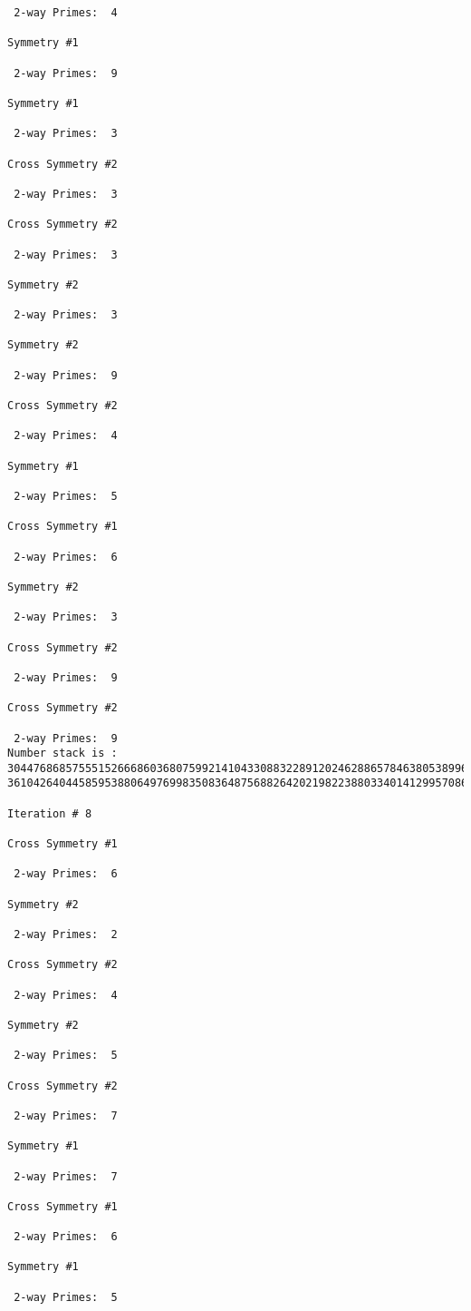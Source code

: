 \begin{verbatim}
 2-way Primes: 	4

Symmetry #1

 2-way Primes: 	9

Symmetry #1

 2-way Primes: 	3

Cross Symmetry #2

 2-way Primes: 	3

Cross Symmetry #2

 2-way Primes: 	3

Symmetry #2

 2-way Primes: 	3

Symmetry #2

 2-way Primes: 	9

Cross Symmetry #2

 2-way Primes: 	4

Symmetry #1

 2-way Primes: 	5

Cross Symmetry #1

 2-way Primes: 	6

Symmetry #2

 2-way Primes: 	3

Cross Symmetry #2

 2-way Primes: 	9

Cross Symmetry #2

 2-way Primes: 	9
Number stack is :
30447686857555152666860368075992141043308832289120246288657846380538996794608835958544046240163340857
36104264044585953880649769983508364875688264202198223880334014129957086306866625155575868674403758043

Iteration #	8

Cross Symmetry #1

 2-way Primes: 	6

Symmetry #2

 2-way Primes: 	2

Cross Symmetry #2

 2-way Primes: 	4

Symmetry #2

 2-way Primes: 	5

Cross Symmetry #2

 2-way Primes: 	7

Symmetry #1

 2-way Primes: 	7

Cross Symmetry #1

 2-way Primes: 	6

Symmetry #1

 2-way Primes: 	5


\end{verbatim}
